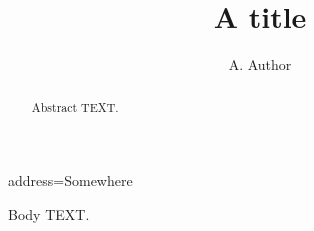 \documentclass[final]{aipproc}
\begin{document}
\title{A title}
\author{A. Author}{address={Somewhere}}
\begin{abstract}
Abstract TEXT.
\end{abstract}
\maketitle
\classification{}
\keywords{}
Body TEXT.
\end{document}
